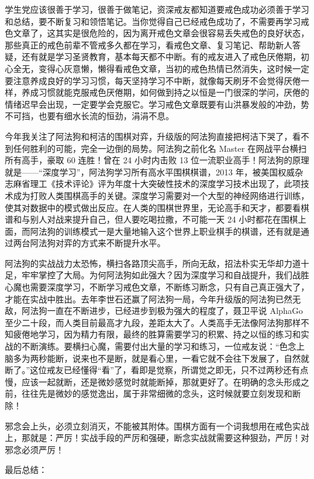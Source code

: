 学生党应该很善于学习，很善于做笔记，资深戒友都知道要戒色成功必须善于学习和总结，要不断复习和领悟笔记。当你觉得自己已经戒色成功了，不需要再学习戒色文章了，这其实是很危险的，因为离开戒色文章会很容易丢失戒色的良好状态，那些真正的戒色前辈不管戒多久都在学习，看戒色文章、复习笔记、帮助新人答疑，还有就是学习圣贤教育，基本每天都不中断。有的戒友进入了戒色厌倦期，初心全无，变得心灰意懒，懒得看戒色文章，当初的戒色热情已然消失，这时候一定要注意养成良好的学习习惯，每天坚持学习不中断，就像每天刷牙不会觉得厌倦一样，养成习惯就能克服戒色厌倦期，如何做到持之以恒是一门很深的学问，厌倦的情绪迟早会出现，一定要学会克服它。学习戒色文章既要有山洪暴发般的冲劲，势不可挡，也要有细水长流的恒劲，涓涓不息。

今年我关注了阿法狗和柯洁的围棋对弈，升级版的阿法狗直接把柯洁下哭了，看不到任何胜利的可能，完全一边倒的局势。阿法狗之前化名 Master 在网战平台横扫所有高手，豪取 60 连胜！曾在 24 小时内击败 13 位一流职业高手！阿法狗的原理就是——“深度学习”，阿法狗学习所有高水平围棋棋谱，2013 年，被美国权威杂志麻省理工《技术评论》评为年度十大突破性技术的深度学习技术出现了，此项技术成为打败人类围棋高手的关键。深度学习需要对一个大型的神经网络进行训练，使其对数据中的模式做出反应。在人类的围棋世界里，无论高手和天才，都要看棋谱和与别人对战来提升自己，但人要吃喝拉撒，不可能一天 24 小时都花在围棋上面，而阿法狗的训练模式一是大量地输入这个世界上职业棋手的棋谱，还有就是通过两台阿法狗对弈的方式来不断提升水平。

阿法狗的实战战力太恐怖，横扫各路顶尖高手，所向无敌，招法朴实无华却力道十足，牢牢掌控了大局。为何阿法狗如此强大？因为深度学习和自战提升，我们战胜心魔也需要深度学习，不断学习戒色文章，不断练习断念，只有自己真正强大了，才能在实战中胜出。去年李世石还赢了阿法狗一局，今年升级版的阿法狗已然无敌，阿法狗一直在不断进步，已经进步到极为强大的程度了，聂卫平说 AlphaGo 至少二十段，而人类目前最高才九段，差距太大了。人类高手无法像阿法狗那样不知疲倦地学习，因为精力有限，最终的胜算需要学习的积累、持之以恒的练习和实战的不断演练。要横扫心魔，需要付出大量的学习和练习，一位戒友说：“色念上脑多为两秒能断，说来也不是断，就是看心里，一看它就不会往下发展了，自然就断了。”这位戒友已经懂得“看”了，看即是觉察，所谓觉之即无，只不过两秒还有点慢，应该一起就断，还是微妙感觉时就能断掉，那就更好了。在明确的念头形成之前，往往先是微妙的感觉逸出，属于非常细微的念头，这时候就要立刻发现和断除！

邪念会上头，必须立刻消灭，不能被其附体。围棋方面有一个词我想用在戒色实战上，那就是：严厉！实战手段的严厉和强硬，断念实战就需要这种狠劲，严厉！对邪念必须严厉！

最后总结：


